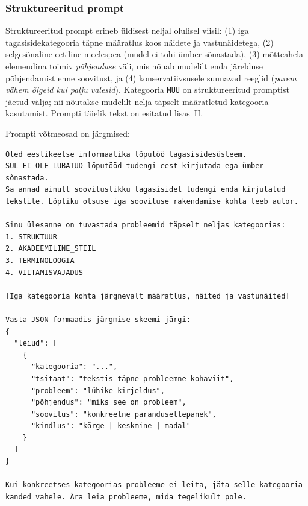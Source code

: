 \subsubsection{Struktureeritud prompt}

Struktureeritud prompt erineb üldisest neljal olulisel viisil: (1) iga tagasisidekategooria täpne määratlus koos näidete ja vastunäidetega, (2) selgesõnaline eetiline meelespea (mudel ei tohi ümber sõnastada), (3) mõtteahela elemendina toimiv \emph{põhjenduse} väli, mis nõuab mudelilt enda järelduse põhjendamist enne soovitust, ja (4) konservatiivsusele suunavad reeglid (\emph{parem vähem õigeid kui palju valesid}). Kategooria \texttt{MUU} on struktureeritud promptist jäetud välja; nii nõutakse mudelilt nelja täpselt määratletud kategooria kasutamist. Prompti täielik tekst on esitatud lisas~II.

Prompti võtmeosad on järgmised:

\begin{verbatim}
Oled eestikeelse informaatika lõputöö tagasisidesüsteem.
SUL EI OLE LUBATUD lõputööd tudengi eest kirjutada ega ümber sõnastada.
Sa annad ainult soovituslikku tagasisidet tudengi enda kirjutatud
tekstile. Lõpliku otsuse iga soovituse rakendamise kohta teeb autor.

Sinu ülesanne on tuvastada probleemid täpselt neljas kategoorias:
1. STRUKTUUR
2. AKADEEMILINE_STIIL
3. TERMINOLOOGIA
4. VIITAMISVAJADUS

[Iga kategooria kohta järgnevalt määratlus, näited ja vastunäited]

Vasta JSON-formaadis järgmise skeemi järgi:
{
  "leiud": [
    {
      "kategooria": "...",
      "tsitaat": "tekstis täpne probleemne kohaviit",
      "probleem": "lühike kirjeldus",
      "põhjendus": "miks see on probleem",
      "soovitus": "konkreetne parandusettepanek",
      "kindlus": "kõrge | keskmine | madal"
    }
  ]
}

Kui konkreetses kategoorias probleeme ei leita, jäta selle kategooria
kanded vahele. Ära leia probleeme, mida tegelikult pole.
\end{verbatim}

